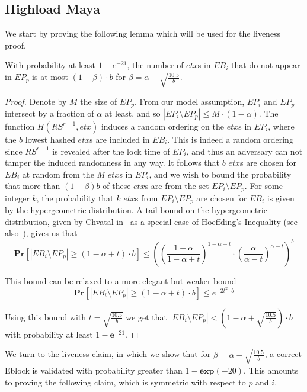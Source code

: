 \subsection{Highload Maya}
We start by proving the following lemma which will be used for the liveness proof.
\begin{lemma}\label{hypergeolemma}
With probability at least $1-e^{-21}$, the number of $etx$s in $EB_i$ that do not appear in $EP_p$ is at most $(1-\beta)\cdot b$ for $\beta=\alpha -\sqrt{\frac{10.5}{b}}$.
\end{lemma}
\begin{proof}
Denote by $M$ the size of $EP_p$. From our model assumption, $EP_i$ and $EP_p$ intersect by a fraction of $\alpha$ at least, and so $|EP_i\setminus EP_p|\leq M\cdot (1-\alpha )$. The function $H(RS^{r-1},etx)$ induces a random ordering on the $etx$s in $EP_i$, where the $b$ lowest hashed $etx$s are included in $EB_i$. This is indeed a random ordering since $RS^{r-1}$ is revealed after the lock time of $EP_i$, and thus an adversary can not tamper the induced randomness in any way. It follows that $b$ $etx$s are chosen for $EB_i$ at random from the $M$ $etx$s in $EP_i$, and we wish to bound the probability that more than $(1-\beta)b$ of these $etx$s are from the set $EP_i\setminus EP_p$. For some integer $k$, the probability that $k$ $etx$s from $EP_i\setminus EP_p$ are chosen for $EB_i$ is given by the hypergeometric distribution. A tail bound on the hypergeometric distribution, given by Chvatal in~\cite{tailchvatal} as a special case of Hoeffding's Inequality (see also~\cite{tailskala}), gives us that
\begin{equation}\label{tail_hypergeo}
\textbf{Pr}[|EB_i\setminus EP_p|\geq (1-\alpha +t)\cdot b]\leq \left ( \left(\frac{1-\alpha}{1-\alpha+t}\right)^{1-\alpha+t}\cdot \left(\frac{\alpha}{\alpha -t}\right )^{\alpha-t} \right)^{b} 
\end{equation}

This bound can be relaxed to a more elegant but weaker bound
\begin{equation}
\textbf{Pr}[|EB_i\setminus EP_p|\geq (1-\alpha +t)\cdot b]\leq e^{-2t^2\cdot b}
\end{equation}

Using this bound with $t=\sqrt{\frac{10.5}{b}}$ we get that $|EB_i\setminus EP_p|< (1-\alpha + \sqrt{\frac{10.5}{b}})\cdot b$ with probability at least $1-\textbf{e}^{-21}$. 
\end{proof}
We turn to the liveness claim, in which we show that for $\beta=\alpha -\sqrt{\frac{10.5}{b}}$, a correct Eblock is validated with probability greater than $1-\textbf{exp}(-20)$. This amounts to proving the following claim, which is symmetric with respect to $p$ and $i$.

